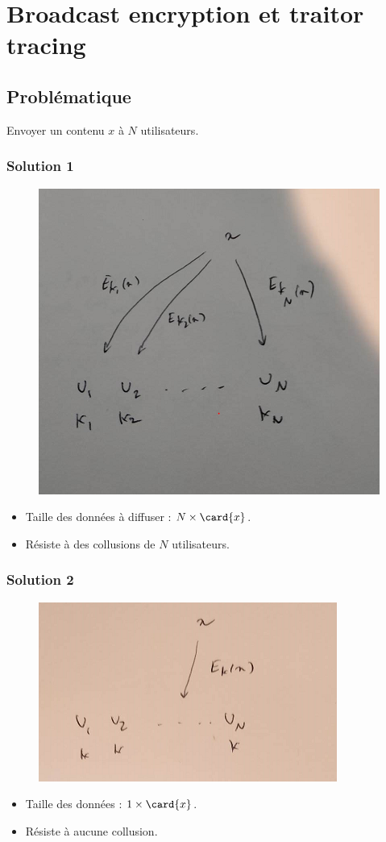     \section{Broadcast encryption et traitor tracing}
        \subsection{Problématique}
            Envoyer un contenu $x$ à $N$ utilisateurs.
            \subsubsection{Solution 1}
                \begin{figure}[H]
                    \centering
                    \includegraphics[width=.5\textwidth]{pictures/2_6}
                \end{figure} \noindent
                \begin{itemize}
                    \item Taille des données à diffuser : $N \times \card{x}$.
                    \item Résiste à des collusions de $N$ utilisateurs.
                \end{itemize}

            \subsubsection{Solution 2}
                \begin{figure}[H]
                    \centering
                    \includegraphics[width=.5\textwidth]{pictures/2_7}
                \end{figure} \noindent
                \begin{itemize}
                    \item Taille des données : $1 \times \card{x}$.
                    \item Résiste à aucune collusion.
                \end{itemize}

